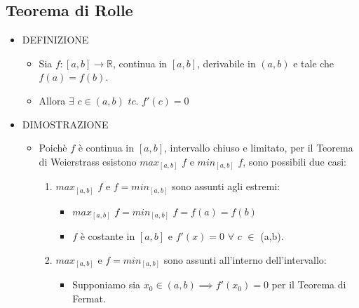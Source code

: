 \documentclass[10pt]{article}
\begin{document}
\subsection{Teorema di Rolle}
\begin{itemize}
\item 
DEFINIZIONE
\begin{itemize}
\item
Sia $f:[a,b] \rightarrow \mathbb{R} $, continua in $[a,b]$, derivabile in $(a,b)$ e tale che $f(a)=f(b)$.
\item 
Allora $\exists$ $c \in (a,b)$ $tc.$ $f'(c)=0$
\end{itemize}\medskip
\item
DIMOSTRAZIONE
\begin{itemize}
\item
Poichè  $f$ è continua in $[a, b]$, intervallo chiuso e limitato, per il Teorema di Weierstrass esistono $max_{[a,b]}$ $f$ e $min_{[a,b]}$ $f$, sono possibili due casi:
\begin{enumerate}
\item
$max_{[a,b]}$ $f$ e $f = min_{[a,b]}$ sono assunti agli estremi:
\begin{itemize}
\item
$max_{[a,b]}$ $f = min_{[a,b]}$ $f = f(a) = f(b)$
\item
$f$ è costante in $[a, b]$ e $f'(x) = 0$ $\forall$ $c$ $\in$ (a,b).
\end{itemize} \medskip
\item
$max_{[a,b]}$ e $f = min_{[a,b]}$ sono assunti all'interno dell'intervallo:
\begin{itemize}
\item
Supponiamo sia $x_0 \in (a,b) \implies f'(x_0) = 0$ per il Teorema di Fermat.
\end{itemize} 
\end{enumerate}
\end{itemize}
\end{itemize}\medskip \medskip
\end{document}
